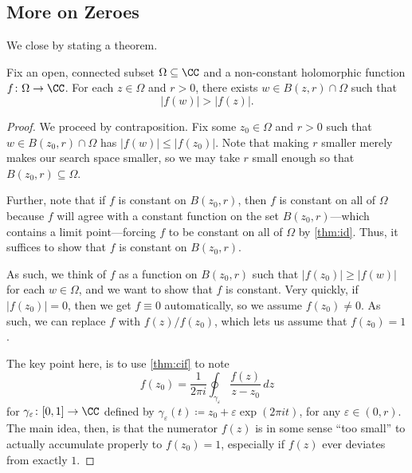 \subsection{More on Zeroes}
We close by stating a theorem.
\begin{theorem} \label{thm:mmp}
	Fix an open, connected subset $\Omega\subseteq\CC$ and a non-constant holomorphic function $f\colon\Omega \to\CC$. For each $z\in\Omega$ and $r>0$, there exists $w\in B(z,r)\cap\Omega$ such that
	\[|f(w)|>|f(z)|.\]
\end{theorem}
\begin{proof}
	We proceed by contraposition. Fix some $z_0\in\Omega$ and $r>0$ such that $w\in B(z_0,r)\cap\Omega$ has $|f(w)|\le|f(z_0)|$. Note that making $r$ smaller merely makes our search space smaller, so we may take $r$ small enough so that $B(z_0,r)\subseteq\Omega$.
	
	Further, note that if $f$ is constant on $B(z_0,r)$, then $f$ is constant on all of $\Omega$ because $f$ will agree with a constant function on the set $B(z_0,r)$---which contains a limit point---forcing $f$ to be constant on all of $\Omega$ by \autoref{thm:id}. Thus, it suffices to show that $f$ is constant on $B(z_0,r)$.

	As such, we think of $f$ as a function on $B(z_0,r)$ such that $|f(z_0)|\ge|f(w)|$ for each $w\in\Omega$, and we want to show that $f$ is constant. Very quickly, if $|f(z_0)|=0$, then we get $f\equiv0$ automatically, so we assume $f(z_0)\ne0$. As such, we can replace $f$ with $f(z)/f(z_0)$, which lets us assume that $f(z_0)=1$.
	
	The key point here, is to use \autoref{thm:cif} to note
	\[f(z_0)=\frac1{2\pi i}\oint_{\gamma_\varepsilon}\frac{f(z)}{z-z_0}\,dz\]
	for $\gamma_\varepsilon\colon [0,1]\to\CC$ defined by $\gamma_\varepsilon(t)\coloneqq z_0+\varepsilon\exp(2\pi it)$, for any $\varepsilon\in(0,r)$. The main idea, then, is that the numerator $f(z)$ is in some sense ``too small'' to actually accumulate properly to $f(z_0)=1$, especially if $f(z)$ ever deviates from exactly $1$.
	

\end{proof}

